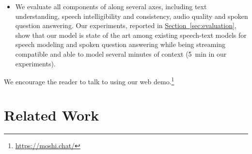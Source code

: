 \begin{itemize}
\item We evaluate all components of \ours{} along several axes, including text understanding, speech intelligibility and consistency, audio quality and spoken question answering. Our experiments, reported in \hyperref[sec:evaluation]{Section~\ref{sec:evaluation}}, show that our model is state of the art among existing speech-text models for speech modeling and spoken question answering while being streaming compatible and able to model several minutes of context (\SI{5}{\minute} in our experiments).
\end{itemize}
We encourage the reader to talk to \ours{} using our web demo.\footnote{\url{https://moshi.chat/}}


\newpage
\section{Related Work}

